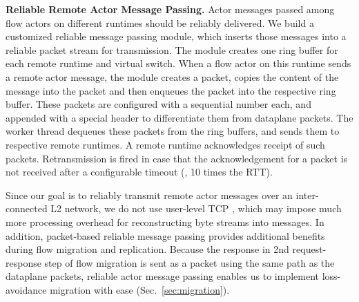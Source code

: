 \vspace{1mm}
\noindent \textbf{Reliable Remote Actor Message Passing.}
Actor messages passed among flow actors on different runtimes should be reliably delivered. We build a customized reliable message passing module, which inserts those messages into a reliable packet stream for transmission. %
The module creates one ring buffer for each remote runtime and virtual switch. When a flow actor on this runtime sends a remote actor message, the module creates a packet, copies the content of the message into the packet and then enqueues the packet into the respective ring buffer. %
These packets are configured with a sequential number each, and appended with a special header to differentiate them from dataplane packets.
The worker thread dequeues these packets from the ring buffers, and sends them to respective remote runtimes. A remote runtime acknowledges receipt of such packets. Retransmission is fired in case that the acknowledgement for a packet is not received after a configurable timeout (\eg, 10 times the RTT).

Since our goal is to reliably transmit remote actor messages over an inter-connected L2 network, we do not use user-level TCP \cite{jeong2014mtcp}, %
which may impose much more processing overhead for reconstructing byte streams into messages.
In addition, packet-based reliable message passing provides additional benefits during flow migration and replication. Because the response in 2nd request-response step of flow migration is sent as a packet using the same path as the dataplane packets, reliable actor message passing enables us to implement loss-avoidance migration with ease (Sec.~\ref{sec:migration}).

